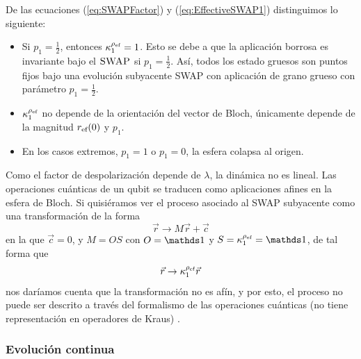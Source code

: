 De las ecuaciones (\ref{eq:SWAPFactor}) y (\ref{eq:EffectiveSWAP1}) distinguimos lo siguiente:
\begin{itemize}
  \item Si $p_{1}=\frac{1}{2}$, entonces $\kappa_{1}^{\rho_{\text{ef}}}=1$. Esto se debe a que la aplicación borrosa es invariante bajo el $\textsc{SWAP}$ si $p_{1}=\frac{1}{2}$. Así, todos los estado gruesos son puntos fijos bajo una evolución subyacente SWAP con aplicación de grano grueso con parámetro $p_{1}=\frac{1}{2}$.
  \item $\kappa_{1}^{\rho_{\text{ef}}}$ no depende de la orientación del vector de Bloch, únicamente depende de la magnitud $r_{\text{ef}}(0)$ y $p_{1}$.
  \item En los casos extremos, $p_{1}=1$ o $p_{1}=0$, la esfera colapsa al origen.
\end{itemize}


Como el factor de despolarización depende de $\lambda$, la dinámica no es lineal. Las operaciones cuánticas de un qubit se traducen como aplicaciones afines en la esfera de Bloch. Si quisiéramos ver el proceso asociado al \textsc{SWAP} subyacente como una transformación de la forma
\begin{equation}
  \vec{r}\rightarrow M\vec{r}+\vec{c}\nonumber
\end{equation}
en la que $\vec{c}=0$, y $M=OS$ con $O=\Id$ y $S=\kappa_{1}^{\rho_{\ef}}=\Id$, de tal forma que
\begin{equation}
  \vec{r}\rightarrow \kappa_{1}^{\rho_{\text{ef}}}\vec{r}\nonumber
\end{equation}
nos daríamos cuenta que la transformación no es afín, y por esto, el proceso no puede ser descrito a través del formalismo de las operaciones cuánticas (no tiene representación en operadores de Kraus) \cite{Chuang}.

\subsubsection{Evolución continua}

